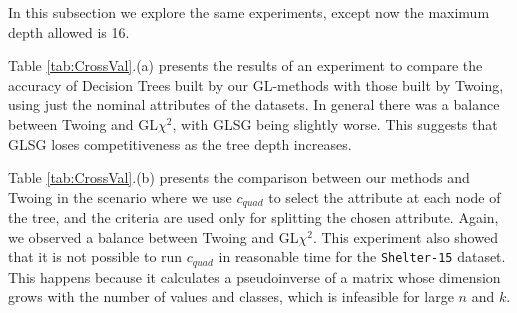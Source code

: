 In this subsection we explore the same experiments, except now the maximum depth allowed is 16. 


Table \ref{tab:CrossVal}.(a) presents  the results of an experiment to
compare the accuracy of  Decision Trees built by our GL-methods with those built by Twoing, using just the nominal attributes of the datasets.
In general there was a balance between Twoing and GL$\chi^2$, with GLSG being slightly worse. This suggests that GLSG loses competitiveness as the tree depth increases.

Table \ref{tab:CrossVal}.(b) presents the 
comparison between  our  methods and Twoing in the scenario where we use $c_{quad}$ to select the attribute at each node of the tree, and the criteria are used only for splitting the chosen attribute. Again, we observed a balance between Twoing and GL$\chi^2$. This experiment also showed that it is not possible to run $c_{quad}$ in reasonable time for the {\tt Shelter-15} dataset. This happens because it calculates a pseudoinverse of a matrix whose dimension grows with the number of values and classes, which is infeasible for large $n$ and $k$.


